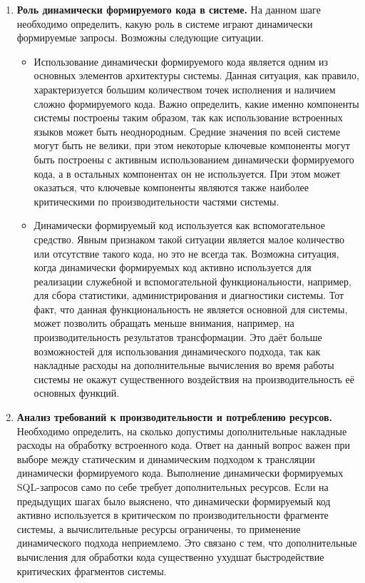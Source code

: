 \begin{enumerate}
  
  \item \textbf{Роль динамически формируемого кода в системе.} На данном шаге необходимо определить, какую роль в системе играют динамически формируемые запросы. Возможны следующие ситуации.
  \begin{itemize}
    \item Использование динамически формируемого кода является одним из основных элементов архитектуры системы. Данная ситуация, как правило, характеризуется большим количеством точек исполнения и наличием сложно формируемого кода. Важно определить, какие именно компоненты системы построены таким образом, так как использование встроенных языков может быть неоднородным. Средние значения по всей системе могут быть не велики, при этом некоторые ключевые компоненты могут быть построены с активным использованием динамически формируемого кода, а в остальных компонентах он не используется. При этом может оказаться, что ключевые компоненты являются также наиболее критическими по производительности частями системы.
    
    \item Динамически формируемый код используется как вспомогательное средство. Явным признаком такой ситуации является малое количество или отсутствие такого кода, но это не всегда так. Возможна ситуация, когда динамически формируемых код активно используется для реализации служебной и вспомогательной функциональности, например, для сбора статистики, администрирования и диагностики системы. Тот факт, что данная функциональность не является основной для системы, может позволить обращать меньше внимания, например, на производительность результатов трансформации. Это даёт больше возможностей для использования динамического подхода, так как накладные расходы на дополнительные вычисления во время работы системы не окажут существенного воздействия на производительность её основных функций.
  \end{itemize}
    
  \item \textbf{Анализ требований к производительности и потреблению ресурсов.} Необходимо определить, на сколько допустимы дополнительные накладные расходы на обработку встроенного кода. Ответ на данный вопрос важен при выборе между статическим и динамическим подходом к трансляции динамически формируемого кода. Выполнение динамически формируемых SQL-запросов само по себе требует дополнительных ресурсов. Если на предыдущих шагах было выяснено, что динамически формируемый код активно используется в критическом по производительности фрагменте системы, а вычислительные ресурсы ограничены, то применение динамического подхода неприемлемо. Это связано с тем, что дополнительные вычисления для обработки кода существенно ухудшат быстродействие критических фрагментов системы.
  

\end{enumerate}
